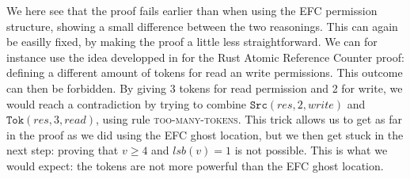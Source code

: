 We here see that the proof fails earlier than when using the EFC permission structure, showing a small difference between the two reasonings. This can again be easilly fixed, by making the proof a little less straightforward. We can for instance use the idea developped in \cite{pascal} for the Rust Atomic Reference Counter proof: defining a different amount of tokens for read an write permissions. This outcome can then be forbidden. By giving 3 tokens for read permission and 2 for write, we would reach a contradiction by trying to combine  $\texttt{Src}(res, 2, write)$ and $\texttt{Tok}(res, 3, read)$, using rule \textsc{too-many-tokens}. This trick allows us to get as far in the proof as we did using the EFC ghost location, but we then get stuck in the next step: proving that $v \geq 4$ and $lsb(v) = 1$ is not possible. This is what we would expect: the tokens are not more powerful than the EFC ghost location.

